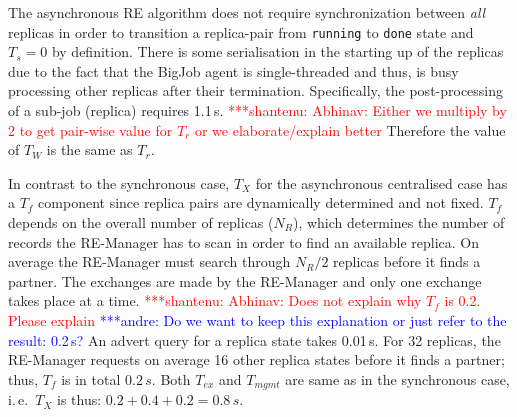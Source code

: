 \documentclass{rspublic}
\newcommand{\jhanote}[1]{ {\textcolor{red} { ***shantenu: #1 }}}
\newcommand{\alnote}[1]{ {\textcolor{blue} { ***andre: #1 }}}
\newcommand{\athotanote}[1]{ {\textcolor{green} { ***athota: #1 }}}
\newcommand{\alnote}[1]{}
\newcommand{\athotanote}[1]{}
\newcommand{\jhanote}[1]{}
\begin{document}
The asynchronous RE algorithm does not require synchronization between
{\it all} replicas in order to transition a replica-pair from
\texttt{running} to \texttt{done} state and $T_s = 0$ by definition.
There is some serialisation in the starting up of the replicas due to
the fact that the BigJob agent is single-threaded and thus, is busy
processing other replicas after their termination.  Specifically, the
post-processing of a sub-job (replica) requires
1.1\,s. \jhanote{Abhinav: Either we multiply by 2 to get pair-wise
  value for $T_r$ or we elaborate/explain better} Therefore the
value of $T_W$ is the same as $T_r$.



In contrast to the synchronous case, $T_X$ for the asynchronous
centralised case has a $T_f$ component since replica pairs are
dynamically determined and not fixed. $T_f$ depends on the overall
number of replicas ($N_R$), which determines the number of records the
RE-Manager has to scan in order to find an available replica. On
average the RE-Manager must search through $N_R/2$ replicas before it
finds a partner.  The exchanges are made by the RE-Manager and only
one exchange takes place at a time. \jhanote{Abhinav: Does not explain
  why $T_f$ is 0.2. Please explain} \alnote{Do we want to keep this
  explanation or just refer to the result: 0.2\,s?} An advert query for a replica
state takes 0.01\,s. For 32 replicas, the RE-Manager requests on
average 16 other replica states before it finds a partner; thus, $T_f$
is in total $0.2\,s$. Both $T_{ex}$ and $T_{mgmt}$ are same as in the
synchronous case, i.\,e.\ $T_{X}$ is thus: $0.2+0.4+0.2=0.8\,s$.
\end{document}
